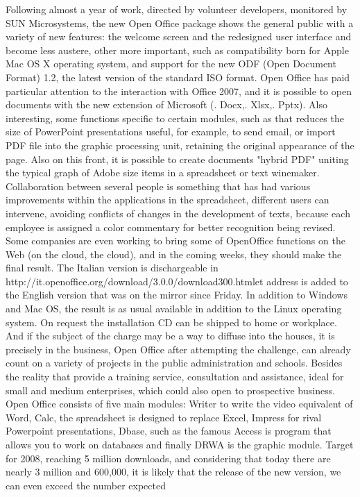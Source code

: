 Following almost a year of work, directed by volunteer developers, monitored by SUN Microsystems, the new Open Office package shows the general public with a variety of new features: the welcome screen and the redesigned user interface and become less austere, other more important, such as compatibility born for Apple Mac OS X operating system, and support for the new ODF (Open Document Format) 1.2, the latest version of the standard ISO format.
Open Office has paid particular attention to the interaction with Office 2007, and it is possible to open documents with the new extension of Microsoft (. Docx,. Xlsx,. Pptx).
Also interesting, some functions specific to certain modules, such as that reduces the size of PowerPoint presentations useful, for example, to send email, or import PDF file into the graphic processing unit, retaining the original appearance of the page.
Also on this front, it is possible to create documents "hybrid PDF" uniting the typical graph of Adobe size items in a spreadsheet or text winemaker.
Collaboration between several people is something that has had various improvements within the applications in the spreadsheet, different users can intervene, avoiding conflicts of changes in the development of texts, because each employee is assigned a color commentary for better recognition being revised.
Some companies are even working to bring some of OpenOffice functions on the Web (on the cloud, the cloud), and in the coming weeks, they should make the final result.
The Italian version is dischargeable in http://it.openoffice.org/download/3.0.0/download300.htmlet address is added to the English version that was on the mirror since Friday.
In addition to Windows and Mac OS, the result is as usual available in addition to the Linux operating system.
On request the installation CD can be shipped to home or workplace.
And if the subject of the charge may be a way to diffuse into the houses, it is precisely in the business, Open Office after attempting the challenge, can already count on a variety of projects in the public administration and schools.
Besides the reality that provide a training service, consultation and assistance, ideal for small and medium enterprises, which could also open to prospective business.
Open Office consists of five main modules: Writer to write the video equivalent of Word, Calc, the spreadsheet is designed to replace Excel, Impress for rival Powerpoint presentations, Dbase, such as the famous Access is program that allows you to work on databases and finally DRWA is the graphic module.
Target for 2008, reaching 5 million downloads, and considering that today there are nearly 3 million and 600,000, it is likely that the release of the new version, we can even exceed the number expected
